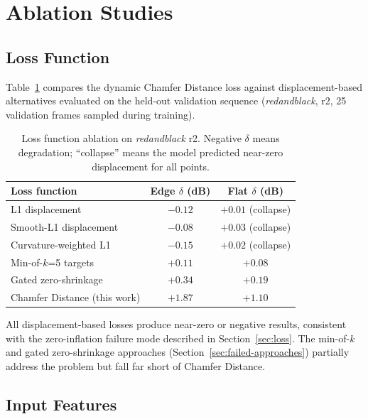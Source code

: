 \section{Ablation Studies}
\label{sec:ablation}

\subsection{Loss Function}
\label{ssec:ablation-loss}

Table~\ref{tab:ablation-loss} compares the dynamic Chamfer Distance loss
against displacement-based alternatives evaluated on the held-out validation
sequence (\textit{redandblack}, r2, 25 validation frames sampled during
training).

\begin{table}[t]
  \centering
  \caption{%
    Loss function ablation on \textit{redandblack} r2.
    Negative $\delta$ means degradation; ``collapse'' means the model
    predicted near-zero displacement for all points.
  }
  \label{tab:ablation-loss}
  \begin{tabular}{lcc}
    \toprule
    Loss function & Edge $\delta$ (dB) & Flat $\delta$ (dB) \\
    \midrule
    L1 displacement          & $-0.12$ & $+0.01$ (collapse) \\
    Smooth-L1 displacement   & $-0.08$ & $+0.03$ (collapse) \\
    Curvature-weighted L1    & $-0.15$ & $+0.02$ (collapse) \\
    Min-of-$k$=5 targets     & $+0.11$ & $+0.08$ \\
    Gated zero-shrinkage     & $+0.34$ & $+0.19$ \\
    Chamfer Distance (this work) & $\mathbf{+1.87}$ & $\mathbf{+1.10}$ \\
    \bottomrule
  \end{tabular}
\end{table}

All displacement-based losses produce near-zero or negative results,
consistent with the zero-inflation failure mode described in Section~\ref{sec:loss}.
The min-of-$k$ and gated zero-shrinkage approaches (Section~\ref{sec:failed-approaches})
partially address the problem but fall far short of Chamfer Distance.

\subsection{Input Features}
\label{ssec:ablation-curvature}

